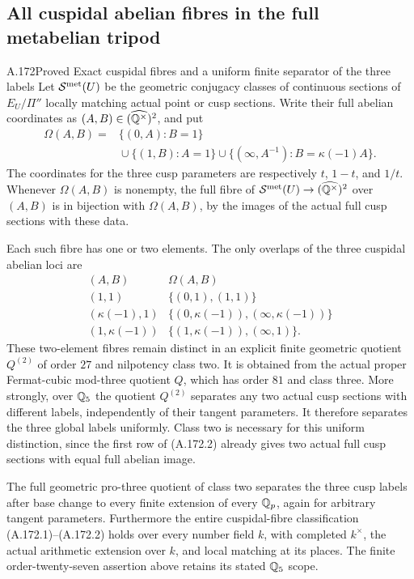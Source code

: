 \subsection{All cuspidal abelian fibres in the full metabelian tripod}

\begin{statement}{A.172}{Proved}
{Exact cuspidal fibres and a uniform finite separator of the three labels}
Let \(\mathcal S^{\rm met}(U)\) be the geometric conjugacy classes
of continuous sections of \(E_U/\Pi''\) locally matching actual
point or cusp sections.  Write their full abelian coordinates as
\((A,B)\in(\widehat{\mathbb Q^\times})^2\), and put
\[
 \begin{split}
 \Omega(A,B)={}&\{(0,A):B=1\}\\
       &{}\cup\{(1,B):A=1\}
        \cup\{(\infty,A^{-1}):B=\kappa(-1)A\}.
 \end{split}
\tag{A.172.1}
\]
The coordinates for the three cusp parameters are respectively
\(t\), \(1-t\), and \(1/t\).
Whenever \(\Omega(A,B)\) is nonempty, the full fibre of
\(\mathcal S^{\rm met}(U)\to(\widehat{\mathbb Q^\times})^2\)
over \((A,B)\) is in bijection with \(\Omega(A,B)\), by the
images of the actual full cusp sections with these data.

Each such fibre has one or two elements.  The only overlaps of
the three cuspidal abelian loci are
\[
 \begin{array}{c|c}
 (A,B)&\Omega(A,B)\\\hline
 (1,1)&\{(0,1),(1,1)\}\\
 (\kappa(-1),1)&\{(0,\kappa(-1)),(\infty,\kappa(-1))\}\\
 (1,\kappa(-1))&\{(1,\kappa(-1)),(\infty,1)\}.
 \end{array}
\tag{A.172.2}
\]
These two-element fibres remain distinct in an explicit finite
geometric quotient \(Q^{(2)}\) of order \(27\) and nilpotency class
two.  It is obtained from the actual proper Fermat-cubic mod-three
quotient \(Q\), which has order \(81\) and class three.
More strongly, over \(\mathbb Q_5\) the quotient \(Q^{(2)}\)
separates any two actual cusp sections with different labels,
independently of their tangent parameters.  It therefore separates
the three global labels uniformly.  Class two is necessary for
this uniform distinction, since the first row of (A.172.2) already
gives two actual full cusp sections with equal full abelian image.

The full geometric pro-three quotient of class two separates the
three cusp labels after base change to every finite extension of
every \(\mathbb Q_p\), again for arbitrary tangent parameters.
Furthermore the entire cuspidal-fibre classification (A.172.1)--(A.172.2)
holds over every number field \(k\), with completed \(k^\times\),
the actual arithmetic extension over \(k\), and local matching
at its places.  The finite order-twenty-seven assertion above
retains its stated \(\mathbb Q_5\) scope.
\end{statement}


